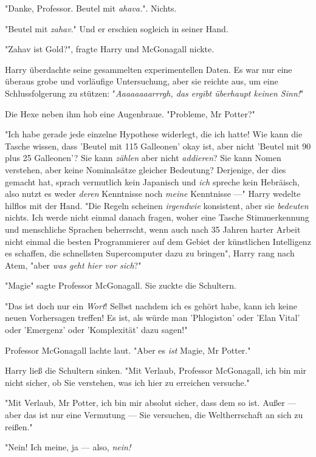 {"Danke, Professor. Beutel mit \emph{ahava.}". Nichts.

"Beutel mit \emph{zahav}." Und er erschien sogleich in seiner Hand.

"Zahav ist Gold?", fragte Harry und McGonagall nickte.

Harry überdachte seine gesammelten experimentellen Daten. Es war nur eine überaus grobe und vorläufige Untersuchung, aber sie reichte aus, um eine Schlussfolgerung zu stützen: "\emph{Aaaaaaaarrrgh, das ergibt überhaupt keinen Sinn!}"

Die Hexe neben ihm hob eine Augenbraue. "Probleme, Mr Potter?"

"Ich habe gerade jede einzelne Hypothese widerlegt, die ich hatte! Wie kann die Tasche wissen, dass 'Beutel mit 115 Galleonen' okay ist, aber nicht 'Beutel mit 90 plus 25 Galleonen'? Sie kann \emph{zählen} aber nicht \emph{addieren}? Sie kann Nomen verstehen, aber keine Nominalsätze gleicher Bedeutung? Derjenige, der dies gemacht hat, sprach vermutlich kein Japanisch und \emph{ich} spreche kein Hebräisch, also nutzt es weder \emph{deren} Kenntnisse noch \emph{meine} Kenntnisse ---" Harry wedelte hilflos mit der Hand. "Die Regeln scheinen \emph{irgendwie} konsistent, aber sie \emph{bedeuten} nichts. Ich werde nicht einmal danach fragen, woher eine Tasche Stimmerkennung und menschliche Sprachen beherrscht, wenn auch nach 35 Jahren harter Arbeit nicht einmal die besten Programmierer auf dem Gebiet der künstlichen Intelligenz es schaffen, die schnellsten Supercomputer dazu zu bringen", Harry rang nach Atem, "aber \emph{was geht hier vor sich}?"

"Magie" sagte Professor McGonagall. Sie zuckte die Schultern.

"Das ist doch nur ein \emph{Wort}! Selbst nachdem ich es gehört habe, kann ich keine neuen Vorhersagen treffen! Es ist, als würde man 'Phlogiston' oder 'Elan Vital' oder 'Emergenz' oder 'Komplexität' dazu sagen!"

Professor McGonagall lachte laut. "Aber es \emph{ist} Magie, Mr Potter."

Harry ließ die Schultern sinken. "Mit Verlaub, Professor McGonagall, ich bin mir nicht sicher, ob Sie verstehen, was ich hier zu erreichen versuche."

"Mit Verlaub, Mr Potter, ich bin mir absolut sicher, dass dem so ist. Außer --- aber das ist nur eine Vermutung --- Sie versuchen, die Weltherrschaft an sich zu reißen."

"Nein! Ich meine, ja --- also, \emph{nein!}

}
